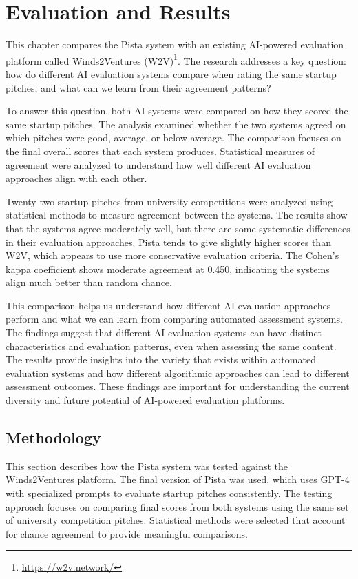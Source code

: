 \chapter{Evaluation and Results}
\label{ch:evaluation}

This chapter compares the Pista system with an existing AI-powered evaluation platform called Winds2Ventures (W2V)\footnote{\url{https://w2v.network/}}. The research addresses a key question: how do different AI evaluation systems compare when rating the same startup pitches, and what can we learn from their agreement patterns?

To answer this question, both AI systems were compared on how they scored the same startup pitches. The analysis examined whether the two systems agreed on which pitches were good, average, or below average. The comparison focuses on the final overall scores that each system produces. Statistical measures of agreement were analyzed to understand how well different AI evaluation approaches align with each other.

Twenty-two startup pitches from university competitions were analyzed using statistical methods to measure agreement between the systems. The results show that the systems agree moderately well, but there are some systematic differences in their evaluation approaches. Pista tends to give slightly higher scores than W2V, which appears to use more conservative evaluation criteria. The Cohen's kappa coefficient shows moderate agreement at 0.450, indicating the systems align much better than random chance.

This comparison helps us understand how different AI evaluation approaches perform and what we can learn from comparing automated assessment systems. The findings suggest that different AI evaluation systems can have distinct characteristics and evaluation patterns, even when assessing the same content. The results provide insights into the variety that exists within automated evaluation systems and how different algorithmic approaches can lead to different assessment outcomes. These findings are important for understanding the current diversity and future potential of AI-powered evaluation platforms.

\section{Methodology}
\label{sec:methodology}

This section describes how the Pista system was tested against the Winds2Ventures platform. The final version of Pista was used, which uses GPT-4 with specialized prompts to evaluate startup pitches consistently. The testing approach focuses on comparing final scores from both systems using the same set of university competition pitches. Statistical methods were selected that account for chance agreement to provide meaningful comparisons.

